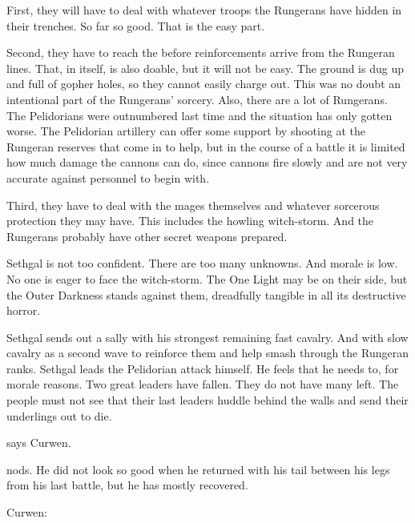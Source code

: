 First, they will have to deal with whatever troops the Rungerans have hidden in their trenches. 
So far so good. 
That is the easy part. 

Second, they have to reach the \ishrah before reinforcements arrive from the Rungeran lines.
That, in itself, is also doable, but it will not be easy. 
The ground is dug up and full of gopher holes, so they cannot easily charge out. 
This was no doubt an intentional part of the Rungerans' sorcery. 
Also, there are a lot of Rungerans.
The Pelidorians were outnumbered last time and the situation has only gotten worse. 
The Pelidorian artillery can offer some support by shooting at the Rungeran reserves that come in to help, but in the course of a battle it is limited how much damage the cannons can do, since cannons fire slowly and are not very accurate against personnel to begin with. 

Third, they have to deal with the \ishrah mages themselves and whatever sorcerous protection they may have. 
This includes the howling witch-storm.
And the Rungerans probably have other secret weapons prepared. 

Sethgal is not too confident. 
There are too many unknowns. 
And morale is low.
No one is eager to face the witch-storm. 
The One Light may be on their side, but the Outer Darkness stands against them, dreadfully tangible in all its destructive horror. 

Sethgal sends out a sally with his strongest remaining fast cavalry. 
And with slow cavalry as a second wave to reinforce them and help smash through the Rungeran ranks. 
Sethgal leads the Pelidorian attack himself. 
He feels that he needs to, for morale reasons.
Two great leaders have fallen.
They do not have many left. 
The people must not see that their last leaders huddle behind the walls and send their underlings out to die.

 says Curwen. 

\Shachar nods. 
He did not look so good when he returned with his tail between his legs from his last battle, but he has mostly recovered. 

Curwen: 





\begin{comment}
  \section{Sethgal rides out}
\end{comment}

